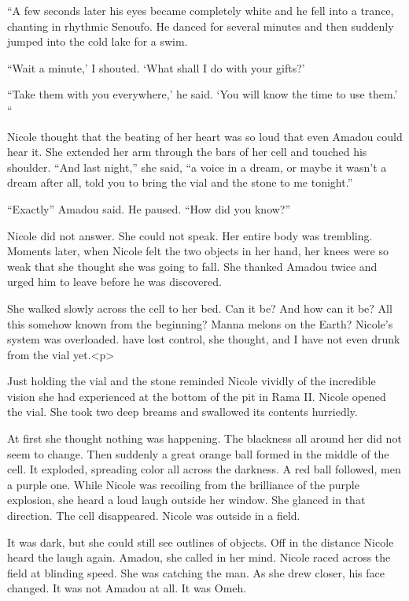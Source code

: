\documentclass[]{article}
\begin{document}
{{“A few seconds later his eyes became completely white and he fell into a trance, chanting in rhythmic Senoufo. He danced for several minutes and then suddenly jumped into the cold lake for a swim.

“Wait a minute,’ I shouted. ‘What shall I do with your gifts?’

“Take them with you everywhere,’ he said. ‘You will know the time to use them.’ “

Nicole thought that the beating of her heart was so loud that even Amadou could hear it. She extended her arm through the bars of her cell and touched his shoulder. “And last night,” she said, “a voice in a dream, or maybe it wasn’t a dream after all, told you to bring the vial and the stone to me tonight.”

“Exactly” Amadou said. He paused. “How did you know?”

Nicole did not answer. She could not speak. Her entire body was trembling. Moments later, when Nicole felt the two objects in her hand, her knees were so weak that she thought she was going to fall. She thanked Amadou twice and urged him to leave before he was discovered.

She walked slowly across the cell to her bed. Can it be? And how can it be? All this somehow known from the beginning? Manna melons on the Earth? Nicole’s system was overloaded. have lost control, she thought, and I have not even drunk from the vial yet.<p>

Just holding the vial and the stone reminded Nicole vividly of the incredible vision she had experienced at the bottom of the pit in Rama II. Nicole opened the vial. She took two deep breams and swallowed its contents hurriedly.

At first she thought nothing was happening. The blackness all around her did not seem to change. Then suddenly a great orange ball formed in the middle of the cell. It exploded, spreading color all across the darkness. A red ball followed, men a purple one. While Nicole was recoiling from the brilliance of the purple explosion, she heard a loud laugh outside her window. She glanced in that direction. The cell disappeared. Nicole was outside in a field.

It was dark, but she could still see outlines of objects. Off in the distance Nicole heard the laugh again. Amadou, she called in her mind. Nicole raced across the field at blinding speed. She was catching the man. As she drew closer, his face changed. It was not Amadou at all. It was Omeh.

}}
\end{document}

